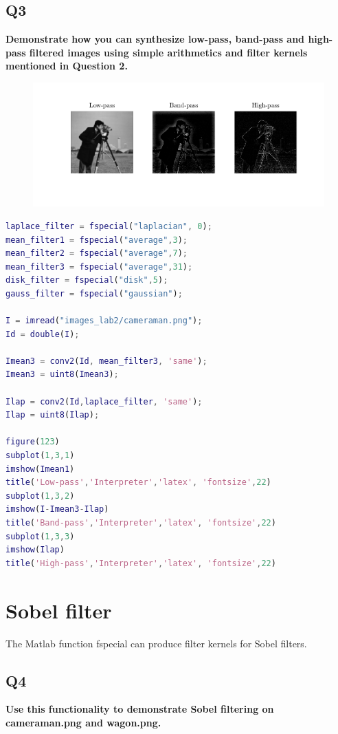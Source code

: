 \documentclass[oneside,a4paper]{article}
\begin{document}
\subsection*{Q3}
\noindent \textbf{Demonstrate how you can synthesize low-pass, band-pass and high-pass filtered images using simple arithmetics and filter kernels mentioned in Question 2.}

\begin{figure}[ht!]
\centering
\includegraphics[width=130mm]{figures/Q3.png}
\caption{}
\label{fig:Q3}
\end{figure}

\begin{lstlisting}[language=MATLAB]
laplace_filter = fspecial("laplacian", 0);
mean_filter1 = fspecial("average",3);
mean_filter2 = fspecial("average",7);
mean_filter3 = fspecial("average",31);
disk_filter = fspecial("disk",5);
gauss_filter = fspecial("gaussian");

I = imread("images_lab2/cameraman.png");
Id = double(I);

Imean3 = conv2(Id, mean_filter3, 'same');
Imean3 = uint8(Imean3); 

Ilap = conv2(Id,laplace_filter, 'same');
Ilap = uint8(Ilap);

figure(123)
subplot(1,3,1)
imshow(Imean1)
title('Low-pass','Interpreter','latex', 'fontsize',22)
subplot(1,3,2)
imshow(I-Imean3-Ilap)
title('Band-pass','Interpreter','latex', 'fontsize',22)
subplot(1,3,3)
imshow(Ilap)
title('High-pass','Interpreter','latex', 'fontsize',22)

\end{lstlisting}


\newpage

\section{Sobel filter}
The Matlab function fspecial can produce filter kernels for Sobel filters.
\subsection*{Q4}
\noindent \textbf{Use this functionality to demonstrate Sobel filtering on cameraman.png and wagon.png.
}
\end{document}
